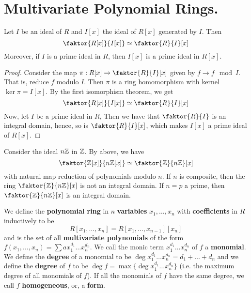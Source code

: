 
\section{Multivariate Polynomial Rings.}

\begin{theorem}\label{3.1.1}
    Let $I$ be an ideal of  $R$ and  $I[x]$ the ideal of $R[x]$ generated by
    $I$. Then
    \begin{equation*}
        \faktor{R[x]}{I[x]} \simeq \faktor{R}{I}[x]
    \end{equation*}
    Moreover, if $I$ is a prime ideal in $R$, then $I[x]$ is a prime ideal in
    $R[x]$.
\end{theorem}
\begin{proof}
    Consider the map $\pi:R[x] \xrightarrow{} \faktor{R}{I}[x]$ given by $f
    \xrightarrow{} f \mod{I}$. That is, reduce $f$ modulo  $I$.  Then $\pi$ is a
    ring homomorphism with kernel $\ker{\pi}=I[x]$. By the first isomorphism
    theorem, we get
    \begin{equation*}
        \faktor{R[x]}{I[x]} \simeq \faktor{R}{I}[x]
    \end{equation*}
    Now, let $I$ be a prime ideal in $R$, Then we have that $\faktor{R}{I}$ is
    an integral domain, hence, so is $\faktor{R}{I}[x]$, which makes $I[x]$ a
    prime ideal of $R[x]$.
\end{proof}

\begin{example}\label{3.1}
    Consider the ideal $n\mathbb{Z}$ in  $\mathbb{Z}$. By above, we have
    \begin{equation*}
        \faktor{\Z[x]}{n\Z[x]} \simeq \faktor{\Z}{n\Z}[x]
    \end{equation*}
    with natural map reduction of polynomials modulo $n$. If $n$ is composite,
    then the ring $\faktor{\Z}{n\Z}[x]$ is not an integral domain. If $n=p$ a
    prime, then  $\faktor{\Z}{n\Z}[x]$ is an integral domain.
\end{example}

\begin{definition}
    We define the \textbf{polynomial ring} in $n$  \textbf{variables} $x_1,
    \dots, x_n$ with \textbf{coefficients} in $R$ inductively to be
    \begin{equation*}
        R[x_1, \dots, x_n]=R[x_1, \dots, x_{n-1}][x_n]
    \end{equation*}
    and is the set of all \textbf{multivariate polynomials} of the form $f(x_1,
    \dots,x_n)=\sum{ax_1^{d_1} \dots x_n^{d_n}}$. We call the monic term
    $x_1^{d_1} \dots x_n^{d_n}$ of $f$ a  \textbf{monomial}. We define the
    \textbf{degree} of a monomial to be $\deg{x_1^{d_1} \dots
    x_n^{d_n}}=d_1+\dots+d_n$ and we define the \textbf{degree} of $f$ to be
    $\deg{f}=\max{\{\deg{x_1^{d_1} \dots x_n^{d_n}}\}}$ (i.e. the maximum degree
    of all monomials of $f$). If all the monomials of $f$ have the same degree,
    we call  $f$  \textbf{homogeneous}, or, a \textbf{form}.
\end{definition}

